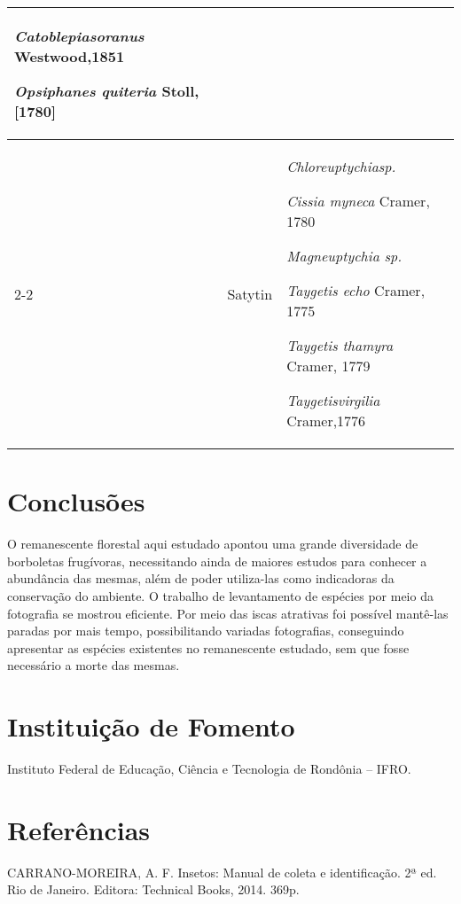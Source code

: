\documentclass[article,12pt,onesidea,4paper,english,brazil]{abntex2}
\begin{document}
\begin{table}[h]
\begin{tabular}{ l l l }
{			\textit{Catoblepiasoranus} Westwood,1851  			
			
			\textit{Opsiphanes quiteria} Stoll,[1780]}
		\\  
		\cline{2-2}\cline{3-3}  
		\multicolumn{1}{||}{} &
		\multicolumn{1}{p{1.283cm}|}{Satytin} &
		\multicolumn{1}{p{3.600cm}|}{\textit{Chloreuptychiasp.}  			
			
			\textit{Cissia myneca} Cramer, 1780  			
			
			\textit{Magneuptychia sp.}  			
			
			\textit{Taygetis echo }Cramer, 1775  			
			
			\textit{Taygetis thamyra} Cramer, 1779  			
			
			\textit{Taygetisvirgilia} Cramer,1776}
		\\  
		\hline
		
\end{tabular} 
	\end{table}
	
	\section*{Conclusões}
	
	O remanescente florestal aqui estudado apontou uma grande diversidade de borboletas frugívoras, necessitando ainda de maiores estudos para conhecer a abundância das mesmas, além de poder utiliza-las como indicadoras da conservação do ambiente. O trabalho de levantamento de espécies por meio da fotografia se mostrou eficiente. Por meio das iscas atrativas foi possível mantê-las paradas por mais tempo, possibilitando variadas fotografias, conseguindo apresentar as espécies existentes no remanescente estudado, sem que fosse necessário a morte das mesmas.
	
	\section*{Instituição de Fomento}
	
Instituto Federal de Educação, Ciência e Tecnologia de Rondônia – IFRO.
	
	\sloppy
	\section*{Referências}
	
	\noindent CARRANO-MOREIRA, A. F. Insetos: Manual de coleta e identificação. 2ª ed. Rio de Janeiro. Editora: Technical Books, 2014. 369p.
	
\end{document}
